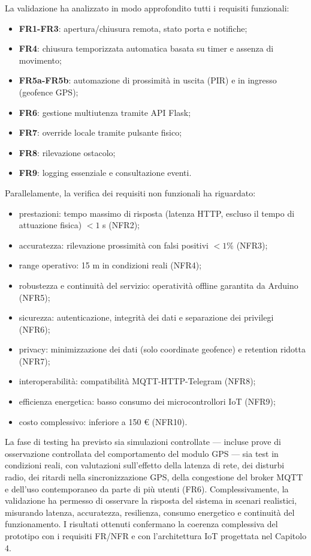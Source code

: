 La validazione ha analizzato in modo approfondito tutti i requisiti funzionali:
\begin{itemize}
    \item \textbf{FR1-FR3}: apertura/chiusura remota, stato porta e notifiche;
    \item \textbf{FR4}: chiusura temporizzata automatica basata su timer e assenza di movimento;
    \item \textbf{FR5a-FR5b}: automazione di prossimità in uscita (PIR) e in ingresso (geofence GPS);
    \item \textbf{FR6}: gestione multiutenza tramite API Flask;
    \item \textbf{FR7}: override locale tramite pulsante fisico;
    \item \textbf{FR8}: rilevazione ostacolo;
    \item \textbf{FR9}: logging essenziale e consultazione eventi.
\end{itemize}

Parallelamente, la verifica dei requisiti non funzionali ha riguardato:
\begin{itemize}
    \item prestazioni: tempo massimo di risposta (latenza HTTP, escluso il tempo di attuazione fisica) $< 1$ s (NFR2);
    \item accuratezza: rilevazione prossimità con falsi positivi $< 1\%$ (NFR3);
    \item range operativo: 15 m in condizioni reali (NFR4);
    \item robustezza e continuità del servizio: operatività offline garantita da Arduino (NFR5);
    \item sicurezza: autenticazione, integrità dei dati e separazione dei privilegi (NFR6);
    \item privacy: minimizzazione dei dati (solo coordinate geofence) e retention ridotta (NFR7);
    \item interoperabilità: compatibilità MQTT-HTTP-Telegram (NFR8);
    \item efficienza energetica: basso consumo dei microcontrollori IoT (NFR9);
    \item costo complessivo: inferiore a 150 € (NFR10).
\end{itemize}

La fase di testing ha previsto sia simulazioni controllate — incluse prove di osservazione controllata del comportamento del modulo GPS \cite{He2019} — sia test in condizioni reali, con valutazioni sull'effetto della latenza di rete, dei disturbi radio, dei ritardi nella sincronizzazione GPS, della congestione del broker MQTT e dell'uso contemporaneo da parte di più utenti (FR6).
Complessivamente, la validazione ha permesso di osservare la risposta del sistema in scenari realistici, misurando latenza, accuratezza, resilienza, consumo energetico e continuità del funzionamento. I risultati ottenuti confermano la coerenza complessiva del prototipo con i requisiti FR/NFR e con l'architettura IoT progettata nel Capitolo 4.

